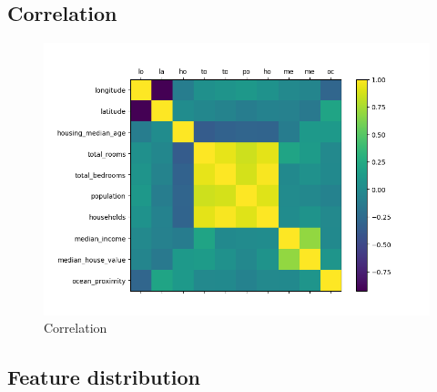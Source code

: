 \documentclass[a4paper, 11pt]{article}
\begin{document}
\subsection{Correlation}
\begin{figure}[h]
    \centering
    \includegraphics[width=1\linewidth]{figs/correlation.png}
    \caption{Correlation}
    \label{fig:correlation}
\end{figure}

\subsection{Feature distribution}
\end{document}
